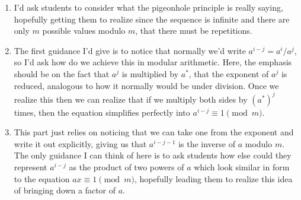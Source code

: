 \documentclass[10pt]{article}
\begin{document}
    \begin{enumerate}[label=(\alph*)]
        \item I'd ask students to consider what the pigeonhole principle is really saying, hopefully getting them to realize since the sequence is infinite and there are only $m$ possible values modulo $m$, that there must be repetitions.
        \item The first guidance I'd give is to notice that normally we'd write $a^{i-j} = a^i/a^j$, so I'd ask how do we achieve this in modular arithmetic. Here, the emphasis should be on the fact that $a^j$ is multiplied by $a^*$, that the exponent of $a^j$ is reduced, analogous to how it normally would be under division. Once we realize this then we can realize that if we multiply both sides by $(a^*)^j$ times, then the equation simplifies perfectly into $a^{i -j} \equiv 1 \pmod m$.
        \item This part just relies on noticing that we can take one from the exponent and write it out explicitly, giving us that $a^{i - j - 1}$ is the inverse of $a$ modulo $m$. The only guidance I can think of here is to ask students how else could they represent $a^{i-j}$ as the product of two powers of $a$ which look similar in form to the equation $ax \equiv 1 \pmod m$, hopefully leading them to realize this idea of bringing down a factor of $a$.
    \end{enumerate}





    
\end{document}
